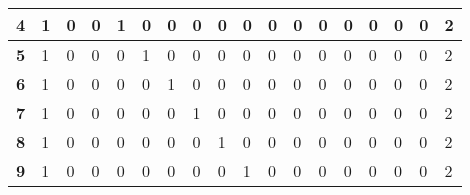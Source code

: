 \begin{table}[]
{\begin{tabular}{|P{0.6cm}|P{0.65cm}|P{0.65cm}|P{0.65cm}|P{0.65cm}|P{0.65cm}|P{0.65cm}|P{0.65cm}|P{0.65cm}|P{0.65cm}|P{0.65cm}|P{0.65cm}|P{0.65cm}|P{0.65cm}|P{0.65cm}|P{0.65cm}|P{0.65cm}|P{2.9cm}|}
\textbf{4}                         & 1                     & 0                     & 0                     & 1                     & 0                     & 0                     & 0                     & 0                     & 0                     & 0                     & 0                     & 0                     & 0                     & 0                     & 0                     & 0                     & 2                     \\ \hline
\textbf{5}                         & 1                     & 0                     & 0                     & 0                     & 1                     & 0                     & 0                     & 0                     & 0                     & 0                     & 0                     & 0                     & 0                     & 0                     & 0                     & 0                     & 2                     \\ \hline
\textbf{6}                         & 1                     & 0                     & 0                     & 0                     & 0                     & 1                     & 0                     & 0                     & 0                     & 0                     & 0                     & 0                     & 0                     & 0                     & 0                     & 0                     & 2                     \\ \hline
\textbf{7}                         & 1                     & 0                     & 0                     & 0                     & 0                     & 0                     & 1                     & 0                     & 0                     & 0                     & 0                     & 0                     & 0                     & 0                     & 0                     & 0                     & 2                     \\ \hline
\textbf{8}                         & 1                     & 0                     & 0                     & 0                     & 0                     & 0                     & 0                     & 1                     & 0                     & 0                     & 0                     & 0                     & 0                     & 0                     & 0                     & 0                     & 2                     \\ \hline
\textbf{9}                         & 1                     & 0                     & 0                     & 0                     & 0                     & 0                     & 0                     & 0                     & 1                     & 0                     & 0                     & 0                     & 0                     & 0                     & 0                     & 0                     & 2                     \\ \hline

\end{tabular}}
\end{table}
